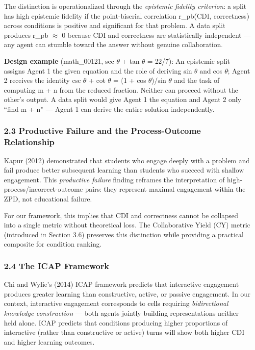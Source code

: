 \documentclass[
  11pt,
]{article}
\begin{document}
The distinction is operationalized through the \emph{epistemic fidelity
criterion}: a split has high epistemic fidelity if the point-biserial
correlation r\_pb(CDI, correctness) across conditions is positive and
significant for that problem. A data split produces r\_pb $\approx$ 0 because
CDI and correctness are statistically independent --- any agent can
stumble toward the answer without genuine collaboration.

\textbf{Design example} (math\_00121, sec $\theta$ + tan $\theta$ = 22/7): An
epistemic split assigns Agent 1 the given equation and the role of
deriving sin $\theta$ and cos $\theta$; Agent 2 receives the identity csc $\theta$ + cot $\theta$ =
(1 + cos $\theta$)/sin $\theta$ and the task of computing m + n from the reduced
fraction. Neither can proceed without the other's output. A data split
would give Agent 1 the equation and Agent 2 only ``find m + n'' ---
Agent 1 can derive the entire solution independently.

\subsubsection{2.3 Productive Failure and the Process-Outcome
Relationship}\label{productive-failure-and-the-process-outcome-relationship}

Kapur (2012) demonstrated that students who engage deeply with a problem
and fail produce better subsequent learning than students who succeed
with shallow engagement. This \emph{productive failure} finding reframes
the interpretation of high-process/incorrect-outcome pairs: they
represent maximal engagement within the ZPD, not educational failure.

For our framework, this implies that CDI and correctness cannot be
collapsed into a single metric without theoretical loss. The
Collaborative Yield (CY) metric (introduced in Section 3.6) preserves
this distinction while providing a practical composite for condition
ranking.

\subsubsection{2.4 The ICAP Framework}\label{the-icap-framework}

Chi and Wylie's (2014) ICAP framework predicts that interactive
engagement produces greater learning than constructive, active, or
passive engagement. In our context, interactive engagement corresponds
to cells requiring \emph{bidirectional knowledge construction} --- both
agents jointly building representations neither held alone. ICAP
predicts that conditions producing higher proportions of interactive
(rather than constructive or active) turns will show both higher CDI and
higher learning outcomes.
\end{document}
